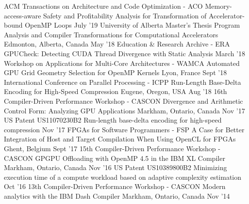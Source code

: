 \begin{cventries}
\publication
  {ACM Transactions on Architecture and Code Optimization - ACO}
  {Memory-access-aware Safety and Profitability Analysis for Transformation of Accelerator-bound OpenMP Loops}
  {}
  {July '19}
\publication
  {University of Alberta Master's Thesis}
  {Program Analysis and Compiler Transformations for Computational Accelerators}
  {Edmonton, Alberta, Canada}
  {May '18}
\publication
  {Education \& Research Archive - ERA}
  {GPUCheck: Detecting CUDA Thread Divergence with Static Analysis}
  {}
  {March '18}
\publication
  {Workshop on Applications for Multi-Core Architectures - WAMCA}
  {Automated GPU Grid Geometry Selection for OpenMP Kernels}
  {Lyon, France}
  {Sept '18}
\publication
  {International Conference on Parallel Processing - ICPP}
  {Run-Length Base-Delta Encoding for High-Speed Compression}
  {Eugene, Oregon, USA}
  {Aug '18}
\presentation
  {16th Compiler-Driven Performance Workshop - CASCON}
  {Divergence and Arithmetic Control Form: Analyzing GPU Applications}
  {Markham, Ontario, Canada}
  {Nov '17}
\publication
  {US Patent US11070230B2}
  {Run-length base-delta encoding for high-speed compression}
  {}
  {Nov '17}
\publication
  {FPGAs for Software Programmers - FSP}
  {A Case for Better Integration of Host and Target Compilation When Using OpenCL for FPGAs}
  {Ghent, Belgium}
  {Sept '17}
\presentation
  {15th Compiler-Driven Performance Workshop - CASCON}
  {GPGPU Offloading with OpenMP 4.5 in the IBM XL Compiler}
  {Markham, Ontario, Canada}
  {Nov '16}
\publication
  {US Patent US10389800B2}
  {Minimizing execution time of a compute workload based on adaptive complexity estimation}
  {}
  {Oct '16}
\presentation
  {13th Compiler-Driven Performance Workshop - CASCON}
  {Modern analytics with the IBM Dash Compiler}
  {Markham, Ontario, Canada}
  {Nov '14}
\end{cventries}
